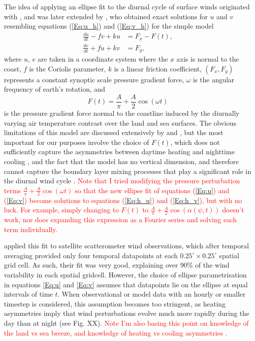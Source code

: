 \documentclass{article}
\begin{document}
\begin{enumerate}
The idea of applying an ellipse fit to the diurnal cycle of surface winds originated with \citet{haurwitz47}, and was later extended by \citet{kusuda83}, who obtained exact solutions for $u$ and $v$ resembling equations (\ref{Eq:u_h}) and (\ref{Eq:v_h}) for the simple model
\begin{align}
\frac{du}{dt} - fv + ku &= F_x - F(t), \label{Eq:h_u}\\
\frac{dv}{dt} + fu + kv &= F_y, \label{Eq:h_v}
\end{align}
where $u$, $v$ are taken in a coordinate system where the $x$ axis is normal to the coast, $f$ is the Coriolis parameter, $k$ is a linear friction coefficient, $\left(F_x, F_y\right)$ represents a constant synoptic scale pressure gradient force, $\omega$ is the angular frequency of earth's rotation, and 
\begin{equation}
F(t) = \frac{A}{\pi} + \frac{A}{2} \cos \left(\omega t\right)
\end{equation}
is the pressure gradient force normal to the coastline induced by the diurnally varying air temperature contrast over the land and sea surfaces. The obvious limitations of this model are discussed extensively by \citet{haurwitz47} and \citet{kusuda83}, but the most important for our purposes involve the choice of $F(t)$, which does not sufficiently capture the asymmetries between daytime heating and nighttime cooling \citep[e.g.][]{svensson11}, and the fact that the model has no vertical dimension, and therefore cannot capture the boundary layer mixing processes that play a significant role in the diurnal wind cycle \citep[e.g.][]{hoxit75}. \textcolor{red}{Note that I tried modifying the pressure perturbation terms $\frac{A}{\pi} + \frac{A}{2} \cos \left(\omega t\right)$ so that the new ellipse fit of equations (\ref{Eq:u}) and (\ref{Eq:v}) become solutions to equations (\ref{Eq:h_u}) and (\ref{Eq:h_v}), but with no luck. For example, simply changing to $F(t)$ to $\frac{A}{\pi} + \frac{A}{2} \cos \left(\alpha\left(\psi,t\right)\right)$ doesn't work, nor does expanding this expression as a Fourier series and solving each term individually.} 

\citet{gille05} applied this fit to satellite scatterometer wind observations, which after temporal averaging provided only four temporal datapoints at each $0.25^\circ \times 0.25^\circ$ spatial grid cell. As such, their fit was very good, explaining over $90\%$ of the wind variability in each spatial gridcell. However, the choice of ellipse parametrisation in equations \ref{Eq:u} and \ref{Eq:v} assumes that datapoints lie on the ellipse at equal intervals of time $t$. When observational or model data with an hourly or smaller timestep is considered, this assumption becomes too stringent, as heating asymmetries imply that wind perturbations evolve much more rapidly during the day than at night (see Fig. XX). \textcolor{red}{Note I'm also basing this point on knowledge of the land vs sea breeze, and knowledge of heating vs cooling asymmetries \citep[][e.g.]{brown17}.} 
\end{enumerate}
\end{document}
